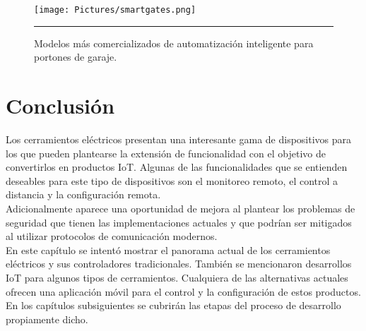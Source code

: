 \begin{figure}[htbp]
	\centering
	\texttt{[image: Pictures/smartgates.png]}
	\rule{35em}{1pt}
	\caption[Smart Garage Gates]{Modelos más comercializados de automatización inteligente para portones de garaje.}
	\label{fig:smartgates}
\end{figure}

\section{Conclusión}
Los cerramientos eléctricos presentan una interesante gama de dispositivos para los que pueden plantearse la extensión de funcionalidad con el objetivo de convertirlos en productos IoT. Algunas de las funcionalidades que se entienden deseables para este tipo de dispositivos son el monitoreo remoto, el control a distancia y la configuración remota.\\
Adicionalmente aparece una oportunidad de mejora al plantear los problemas de seguridad que tienen las implementaciones actuales y que podrían ser mitigados al utilizar protocolos de comunicación modernos.\\
En este capítulo se intentó mostrar el panorama actual de los cerramientos eléctricos y sus controladores tradicionales.
También se mencionaron desarrollos IoT para algunos tipos de cerramientos. Cualquiera de las alternativas actuales ofrecen una aplicación móvil para el control y la configuración de estos productos.\\
En los capítulos subsiguientes se cubrirán las etapas del proceso de desarrollo propiamente dicho.

